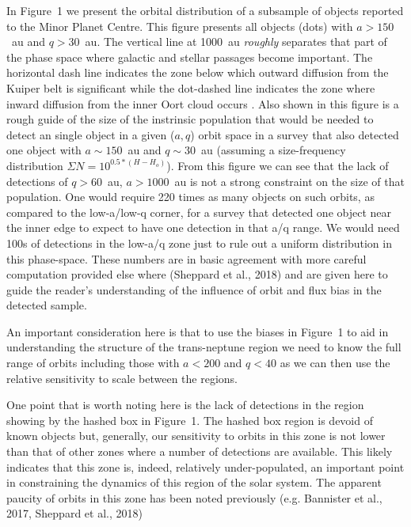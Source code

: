 \documentclass{aastex62}
\begin{document}
In Figure~1 we present the orbital distribution of a subsample of objects reported to the Minor Planet Centre. This figure presents all objects (dots) with $a > 150$~au and $q > 30$~au.  The vertical line at 1000~au {\em roughly} separates that part of the phase space where galactic and stellar passages become important. The horizontal dash line indicates the zone below which outward diffusion from the Kuiper belt is significant while the dot-dashed line indicates the zone where inward diffusion from the inner Oort cloud occurs \citep[see][for details]{bannister17}.  Also shown in this figure is a rough guide of the size of the instrinsic population that would be needed to detect an single object in a given ($a,q$) orbit space in a survey that also detected one object with $a \sim 150$~au and $q \sim 30$~au (assuming a size-frequency distribution  $ \Sigma{N} = 10^{0.5*(H-H_o)}$).  From this figure we can see that the lack of detections of $q>60$~au, $a > 1000$~au is not a strong constraint on the size of that population. One would require 220 times as many objects on such orbits, as compared to the low-a/low-q corner, for a survey that detected one object near the inner edge to expect to have one detection in that a/q range.  We would need 100s of detections in the low-a/q zone just to rule out a uniform distribution in this phase-space.  These numbers are in basic agreement with more careful computation provided else where (Sheppard et al., 2018) and are given here to guide the reader's understanding of the influence of orbit and flux bias in the detected sample.

An important consideration here is that to use the biases in Figure~1 to aid in understanding the structure of the trans-neptune region we need to know the full range of orbits including those with $a< 200$ and $q<40$ as we can then use the relative sensitivity to scale between the regions. 

One point that is worth noting here is the lack of detections in the region showing by the hashed box in Figure~1.  The hashed box region is devoid of known objects but, generally, our sensitivity to orbits in this zone is not lower than that of other zones where a number of detections are available.  This likely indicates that this zone is, indeed, relatively under-populated, an important point in constraining the dynamics of this region of the solar system.  The apparent paucity of orbits in this zone has been noted previously (e.g. Bannister et al., 2017, Sheppard et al., 2018)
\end{document}
